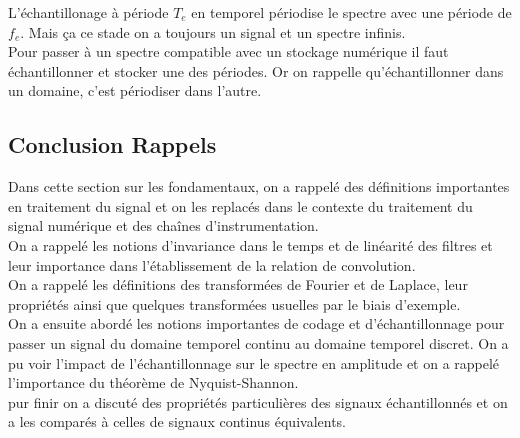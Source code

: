 \documentclass[11pt,a4paper]{article}
\begin{document}
L'échantillonage à période $T_e$ en temporel périodise le spectre avec une période de $f_e$. Mais ça ce stade on a toujours un signal et un spectre infinis.\\ 

Pour passer à un spectre compatible avec un stockage numérique il faut échantillonner et stocker une des périodes. Or on rappelle qu'échantillonner dans un domaine, c'est périodiser dans l'autre.
%


\subsection{Conclusion Rappels}
Dans cette section sur les fondamentaux, on a rappelé des définitions importantes en traitement du signal et on les replacés dans le contexte du traitement du signal numérique et des chaînes d'instrumentation.\\

On a rappelé les notions d'invariance dans le temps et de linéarité des filtres et leur importance dans l'établissement de la relation de convolution.\\

On a rappelé les définitions des transformées de Fourier et de Laplace, leur propriétés ainsi que quelques transformées usuelles par le biais d'exemple.\\

On a ensuite abordé les notions importantes de codage et d'échantillonnage pour passer un signal du domaine temporel continu au domaine temporel discret. On a pu voir l'impact de l'échantillonnage sur le spectre en amplitude et on a rappelé l'importance du théorème de Nyquist-Shannon. \\
pur finir on a discuté des propriétés particulières des signaux échantillonnés et on a les comparés à celles de signaux continus équivalents.\\
\end{document}
